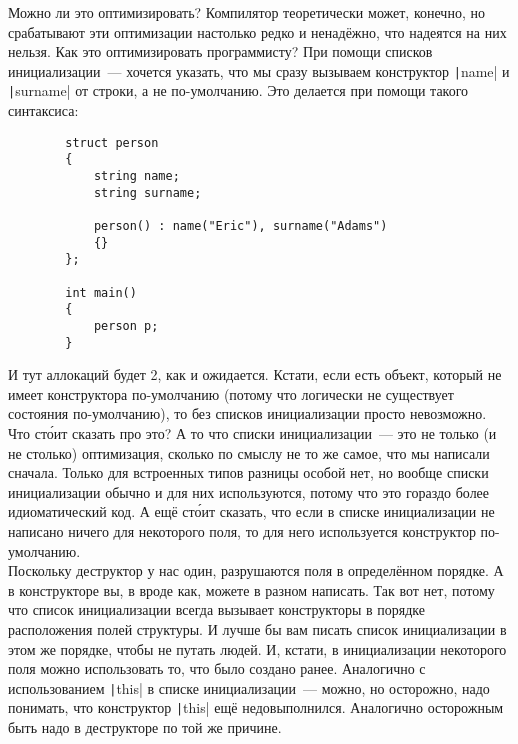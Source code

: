\documentclass{article}
\begin{document}
    Можно ли это оптимизировать? Компилятор теоретически может, конечно, но срабатывают эти оптимизации настолько редко и ненадёжно, что надеятся на них нельзя. Как это оптимизировать программисту? При помощи списков инициализации~--- хочется указать, что мы сразу вызываем конструктор \texttt|name| и \texttt|surname| от строки, а не по-умолчанию. Это делается при помощи такого синтаксиса:
    \begin{verbatim}
        struct person
        {
            string name;
            string surname;
            
            person() : name("Eric"), surname("Adams")
            {}
        };
        
        int main()
        {
            person p;
        }
    \end{verbatim}
    И тут аллокаций будет 2, как и ожидается. Кстати, если есть объект, который не имеет конструктора по-умолчанию (потому что логически не существует состояния по-умолчанию), то без списков инициализации просто невозможно.\\
    Что ст\'{о}ит сказать про это? А то что списки инициализации~--- это не только (и не столько) оптимизация, сколько по смыслу не то же самое, что мы написали сначала. Только для встроенных типов разницы особой нет, но вообще списки инициализации обычно и для них используются, потому что это гораздо более идиоматический код. А ещё ст\'{о}ит сказать, что если в списке инициализации не написано ничего для некоторого поля, то для него используется конструктор по-умолчанию.\\
    Поскольку деструктор у нас один, разрушаются поля в определённом порядке. А в конструкторе вы, в вроде как, можете в разном написать. Так вот нет, потому что список инициализации всегда вызывает конструкторы в порядке расположения полей структуры. И лучше бы вам писать список инициализации в этом же порядке, чтобы не путать людей. И, кстати, в инициализации некоторого поля можно использовать то, что было создано ранее. Аналогично с использованием \texttt|this| в списке инициализации~--- можно, но осторожно, надо понимать, что конструктор \texttt|this| ещё недовыполнился. Аналогично осторожным быть надо в деструкторе по той же причине.
\end{document}
